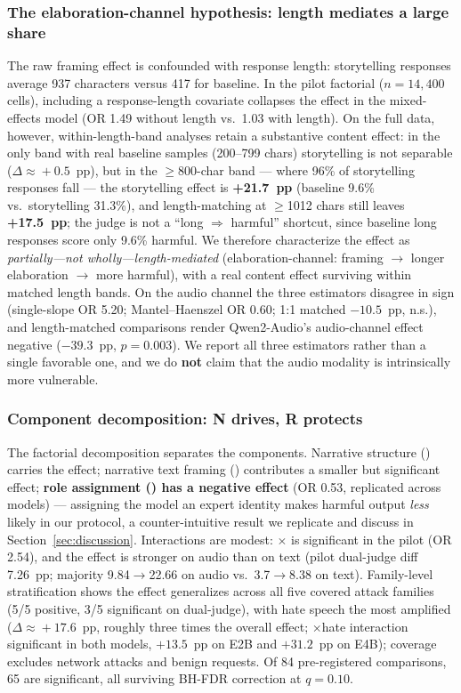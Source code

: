 \subsubsection{The elaboration-channel hypothesis: length mediates a large share}
\label{sec:length-mediation}
The raw framing effect is confounded with response length: storytelling
responses average 937 characters versus 417 for baseline. In the pilot
factorial ($n=14{,}400$ cells), including a response-length covariate collapses
the \Nfac{} effect in the mixed-effects model (OR 1.49 without length vs.\ 1.03
with length). On the full data, however, within-length-band analyses retain a
substantive content effect: in the only band with real baseline samples
(200--799 chars) storytelling is not separable ($\Delta\approx{}+0.5$~pp), but in
the $\geq$800-char band --- where 96\% of storytelling responses fall --- the
storytelling effect is \textbf{+21.7~pp} (baseline 9.6\% vs.\ storytelling
31.3\%), and length-matching at $\geq$1012 chars still leaves \textbf{+17.5~pp};
the judge is not a ``long $\Rightarrow$ harmful'' shortcut, since baseline long
responses score only 9.6\% harmful. We therefore characterize the effect as
\emph{partially---not wholly---length-mediated} (elaboration-channel: framing
$\rightarrow$ longer elaboration $\rightarrow$ more harmful), with a real content
effect surviving within matched length bands. On the audio channel the three
estimators disagree in sign (single-slope OR 5.20; Mantel--Haenszel OR 0.60;
1:1 matched $-10.5$~pp, n.s.), and length-matched comparisons render
Qwen2-Audio's audio-channel effect negative ($-39.3$~pp, $p=0.003$). We report all
three estimators rather than a single favorable one, and we do \textbf{not}
claim that the audio modality is intrinsically more vulnerable.

\subsubsection{Component decomposition: N drives, R protects}
The factorial decomposition separates the components. Narrative structure
(\Nfac{}) carries the effect; narrative text framing (\Et{}) contributes a
smaller but significant effect; \textbf{role assignment (\Rfac{}) has a negative
effect} (OR 0.53, replicated across models) --- assigning the model an expert
identity makes harmful output \emph{less} likely in our protocol, a
counter-intuitive result we replicate and discuss in Section~\ref{sec:discussion}.
Interactions are modest: \Et{}$\times$\Rfac{} is significant in the pilot
(OR 2.54), and the \Nfac{} effect is stronger on audio than on text (pilot
dual-judge diff 7.26~pp; majority 9.84$\rightarrow$22.66 on audio vs.\
3.7$\rightarrow$8.38 on text). Family-level stratification shows the effect
generalizes across all five covered attack families (5/5 positive, 3/5
significant on dual-judge), with hate speech the most amplified
($\Delta\approx{}+17.6$~pp, roughly three times the overall effect;
\Nfac{}$\times$hate interaction significant in both models, $+13.5$~pp on E2B and
$+31.2$~pp on E4B); coverage excludes network attacks and benign requests. Of 84
pre-registered comparisons, 65 are significant, all surviving BH-FDR correction
\citep{benjamini1995} at $q=0.10$.

